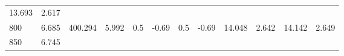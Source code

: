 \documentclass{article}
\begin{document}
\begin{longtable}[]{@{}llllllllllll@{}}
\begin{minipage}[t]{0.06\columnwidth}
13.693\strut
\end{minipage} & \begin{minipage}[t]{0.09\columnwidth}\raggedright\strut
2.617\strut
\end{minipage}\tabularnewline
\begin{minipage}[t]{0.03\columnwidth}\raggedright\strut
800\strut
\end{minipage} & \begin{minipage}[t]{0.06\columnwidth}\raggedright\strut
6.685\strut
\end{minipage} & \begin{minipage}[t]{0.06\columnwidth}\raggedright\strut
400.294\strut
\end{minipage} & \begin{minipage}[t]{0.08\columnwidth}\raggedright\strut
5.992\strut
\end{minipage} & \begin{minipage}[t]{0.03\columnwidth}\raggedright\strut
0.5\strut
\end{minipage} & \begin{minipage}[t]{0.06\columnwidth}\raggedright\strut
-0.69\strut
\end{minipage} & \begin{minipage}[t]{0.03\columnwidth}\raggedright\strut
0.5\strut
\end{minipage} & \begin{minipage}[t]{0.06\columnwidth}\raggedright\strut
-0.69\strut
\end{minipage} & \begin{minipage}[t]{0.06\columnwidth}\raggedright\strut
14.048\strut
\end{minipage} & \begin{minipage}[t]{0.08\columnwidth}\raggedright\strut
2.642\strut
\end{minipage} & \begin{minipage}[t]{0.06\columnwidth}\raggedright\strut
14.142\strut
\end{minipage} & \begin{minipage}[t]{0.09\columnwidth}\raggedright\strut
2.649\strut
\end{minipage}\tabularnewline
\begin{minipage}[t]{0.03\columnwidth}\raggedright\strut
850\strut
\end{minipage} & \begin{minipage}[t]{0.06\columnwidth}\raggedright\strut
6.745\strut
\end{minipage} & \begin{minipage}[t]{0.06\columnwidth}\raggedright\strut

\end{minipage}
\end{longtable}
\end{document}

